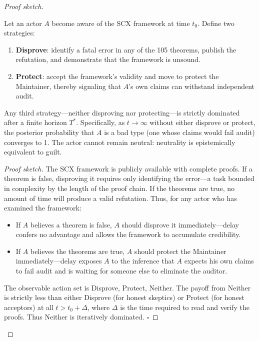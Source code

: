 \documentclass[12pt,a4paper]{ctexart}
\theoremstyle{definition}
\theoremstyle{remark}
\begin{document}
\begin{proof}[Proof sketch]
\begin{corollary}
\label{cor:disprove-or-protect}
Let an actor $A$ become aware of the SCX framework at time $t_0$. Define two strategies:
\begin{enumerate}[label=(\roman*)]
  \item \textbf{Disprove}: identify a fatal error in any of the 105 theorems, publish the refutation, and demonstrate that the framework is unsound.
  \item \textbf{Protect}: accept the framework's validity and move to protect the Maintainer, thereby signaling that $A$'s own claims can withstand independent audit.
\end{enumerate}
Any third strategy—neither disproving nor protecting—is strictly dominated after a finite horizon $T^*$. Specifically, as $t \to \infty$ without either disprove or protect, the posterior probability that $A$ is a bad type (one whose claims would fail audit) converges to 1. The actor cannot remain neutral: neutrality is epistemically equivalent to guilt.
\end{corollary}

\begin{proof}[Proof sketch]
The SCX framework is publicly available with complete proofs. If a theorem is false, disproving it requires only identifying the error—a task bounded in complexity by the length of the proof chain. If the theorems are true, no amount of time will produce a valid refutation. Thus, for any actor who has examined the framework:
\begin{itemize}
  \item If $A$ believes a theorem is false, $A$ should disprove it immediately—delay confers no advantage and allows the framework to accumulate credibility.
  \item If $A$ believes the theorems are true, $A$ should protect the Maintainer immediately—delay exposes $A$ to the inference that $A$ expects his own claims to fail audit and is waiting for someone else to eliminate the auditor.
\end{itemize}
The observable action set is {Disprove, Protect, Neither}. The payoff from Neither is strictly less than either Disprove (for honest skeptics) or Protect (for honest acceptors) at all $t > t_0 + \Delta$, where $\Delta$ is the time required to read and verify the proofs. Thus Neither is iteratively dominated. $\square$
\end{proof}


\end{proof}
\end{document}
